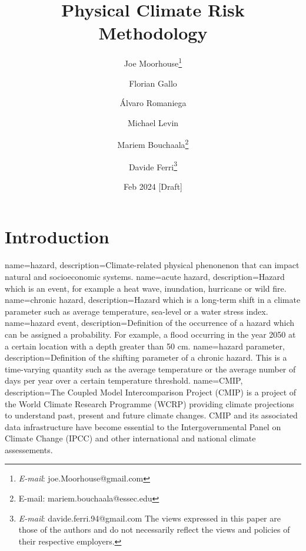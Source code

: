\documentclass[a4paper,11pt]{extarticle} %
\title{Physical Climate Risk Methodology}
\author{Joe Moorhouse\thanks{\textit{E-mail}: joe.Moorhouse@gmail.com}
        \and
        Florian Gallo
        \and
        Álvaro Romaniega
        \and
        Michael Levin
        \and
        Mariem Bouchaala\thanks{{E-mail}: mariem.bouchaala@essec.edu}
        \and
        Davide Ferri\thanks{\textit{E-mail}: davide.ferri.94@gmail.com
        \smallskip
        \newline%
    The views expressed in this paper are those of the authors and do not necessarily reflect the views and policies of their respective employers.}
    }
\date{Feb 2024 [Draft]}
\theoremstyle{definition}
\begin{document}

\maketitle{}



\clearpage
\setcounter{tocdepth}{4}
\renewcommand{\contentsname}{Contents}
\tableofcontents




\clearpage
\section{Introduction}
\label{Sec:Introduction}

{
    name=hazard,
    description=Climate-related physical phenonenon that can impact natural and socioeconomic systems.
}
{
    name=acute hazard,
    description={Hazard which is an event, for example a heat wave, inundation, hurricane or wild fire.}
}
{
    name=chronic hazard,
    description={Hazard which is a long-term shift in a climate parameter such as average temperature, sea-level or a water stress index.}
}
{
    name=hazard event,
    description={Definition of the occurrence of a hazard which can be assigned a probability. For example, a flood occurring in the year 2050 at a certain location with a depth greater than 50 cm.}
}
{
    name=hazard parameter,
    description=Definition of the shifting parameter of a chronic hazard. This is a time-varying quantity such as the average temperature or the average number of days per year over a certain temperature threshold.
}
{
    name=CMIP,
    description={The Coupled Model Intercomparison Project (CMIP) is a project of the World Climate Research Programme (WCRP) providing climate projections to understand past, present and future climate changes. CMIP and its associated data infrastructure have become essential to the Intergovernmental Panel on Climate Change (IPCC) and other international and national climate assessements.}
}
\end{document}
